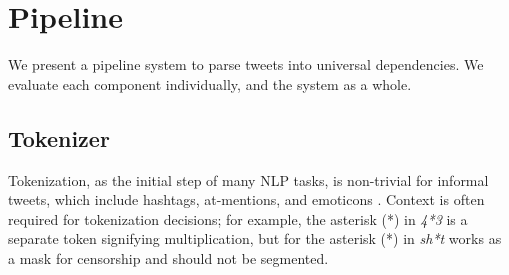 \documentclass[11pt,a4paper]{article}
\begin{document}
%		



\section{Pipeline}
\label{sec:parsing}

We present a pipeline system to parse tweets into universal
dependencies.  We evaluate each component individually, and the system
as a whole.

\subsection{Tokenizer} \label{sec:tok}
Tokenization, as the initial step of many NLP tasks, is non-trivial for
informal tweets, which include hashtags, at-mentions, and emoticons
\cite{ICWSM101540}.  Context is often required for tokenization
decisions; for example,
the asterisk (*) in {\it 4*3} is a separate token signifying
multiplication, but for the asterisk (*) in {\it sh*t}
works as a mask for censorship and should not be segmented.
\end{document}
